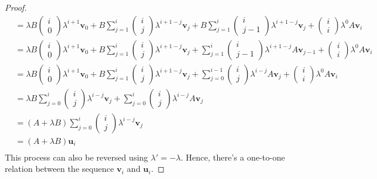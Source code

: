 \documentclass{article}
\newcommand{\0}{\mathbf{0}}
\renewcommand{\vec}{\mathbf}
\newcommand{\vv}{\vec{v}}
\newcommand{\vu}{\vec{u}}
\begin{document}
\begin{proof}
\begin{align*}
        &=\lambda B\begin{pmatrix}i\\0\end{pmatrix}\lambda^{i+1}\vv_0+B\sum_{j=1}^{i}\begin{pmatrix}i\\j\end{pmatrix}\lambda^{i+1-j}\vv_j+B\sum_{j=1}^{i}\begin{pmatrix}i\\j-1\end{pmatrix}\lambda^{i+1-j}\vv_j+\begin{pmatrix}i\\i\end{pmatrix}\lambda^{0}A\vv_{i}\\
        &=\lambda B\begin{pmatrix}i\\0\end{pmatrix}\lambda^{i+1}\vv_0+B\sum_{j=1}^{i}\begin{pmatrix}i\\j\end{pmatrix}\lambda^{i+1-j}\vv_j+\sum_{j=1}^{i}\begin{pmatrix}i\\j-1\end{pmatrix}\lambda^{i+1-j}A\vv_{j-1}+\begin{pmatrix}i\\i\end{pmatrix}\lambda^{0}A\vv_{i}\\
        &=\lambda B\begin{pmatrix}i\\0\end{pmatrix}\lambda^{i+1}\vv_0+B\sum_{j=1}^{i}\begin{pmatrix}i\\j\end{pmatrix}\lambda^{i+1-j}\vv_j+\sum_{j=0}^{i-1}\begin{pmatrix}i\\j\end{pmatrix}\lambda^{i-j}A\vv_{j}+\begin{pmatrix}i\\i\end{pmatrix}\lambda^{0}A\vv_{i}\\
        &=\lambda B\sum_{j=0}^{i}\begin{pmatrix}i\\j\end{pmatrix}\lambda^{i-j}\vv_j+\sum_{j=0}^{i}\begin{pmatrix}i\\j\end{pmatrix}\lambda^{i-j}A\vv_{j}\\
        &=(A+\lambda B)\sum_{j=0}^{i}\begin{pmatrix}i\\j\end{pmatrix}\lambda^{i-j}\vv_j\\
        &=(A+\lambda B)\vu_i\\
    \end{align*}
    This process can also be reversed using $\lambda'=-\lambda$.
    Hence, there's a one-to-one relation between the sequence $\vv_i$ and $\vu_i$.


\end{proof}
\end{document}
